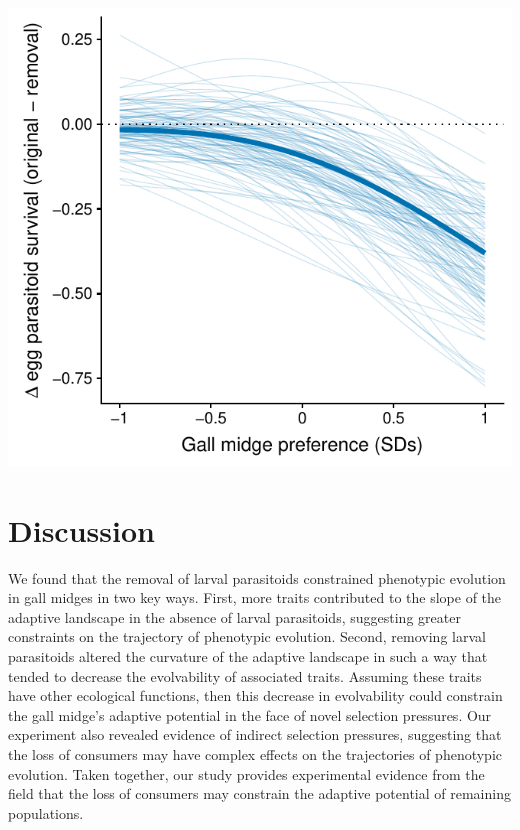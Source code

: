 \documentclass[11pt,]{article}
\let\origfigure\figure
\let\endorigfigure\endfigure
\renewenvironment{figure}[1][2] {
    \expandafter\origfigure\expandafter[H]
} {
    \endorigfigure
}
\begin{document}
\bigskip

\begin{figure}
\centering
\includegraphics{../analyses/selection_on_Platygaster.pdf}
\caption{\label{fig:EggPtoid_Selection}Selection imposed by larval
parasitoids on egg parasitoids (\emph{Platygaster} sp.). The bold line
represents the average difference in the probability of observing the
egg parasitoid (original minus removal of larval parastioids) as a
function of gall midge oviposition preference. Thin lines represent
bootstrapped replicates to show the uncertainty in selection. For
clarity, we only display 100 bootstraps even though inferences are based
on 1,000 replicates. The decrease in the probability of observing egg
parasitoids at high gall-midge densities indicate that larval
parasitoids impose nonlinear selection on egg parasitoids.}
\end{figure}

\bigskip

\section{Discussion}\label{discussion}

We found that the removal of larval parasitoids constrained phenotypic
evolution in gall midges in two key ways. First, more traits contributed
to the slope of the adaptive landscape in the absence of larval
parasitoids, suggesting greater constraints on the trajectory of
phenotypic evolution. Second, removing larval parasitoids altered the
curvature of the adaptive landscape in such a way that tended to
decrease the evolvability of associated traits. Assuming these traits
have other ecological functions, then this decrease in evolvability
could constrain the gall midge's adaptive potential in the face of novel
selection pressures. Our experiment also revealed evidence of indirect
selection pressures, suggesting that the loss of consumers may have
complex effects on the trajectories of phenotypic evolution. Taken
together, our study provides experimental evidence from the field that
the loss of consumers may constrain the adaptive potential of remaining
populations.
\end{document}
